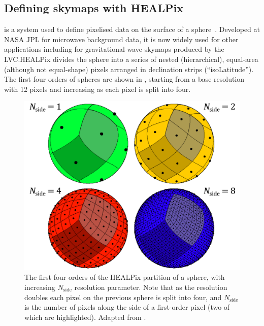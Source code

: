 
\subsection{Defining skymaps with HEALPix}
\label{sec:healpix}
\begin{colsection}

 is a system used to define pixelised data on the surface of a sphere~\citep{HEALPix}. Developed at NASA JPL for microwave background data, it is now widely used for other applications including for gravitational-wave skymaps produced by the LVC.\@ HEALPix divides the sphere into a series of nested (hierarchical), equal-area (although not equal-shape) pixels arranged in declination strips (``isoLatitude''). The first four orders of spheres are shown in , starting from a base resolution with 12 pixels and increasing as each pixel is split into four.

\begin{figure}[t]
    \begin{center}
        \includegraphics[width=0.7\linewidth]{images/healpix.pdf}
    \end{center}
    \caption[HEALPix partitions of a sphere]{
        The first four orders of the HEALPix partition of a sphere, with increasing $N_\text{side}$ resolution parameter. Note that as the resolution doubles each pixel on the previous sphere is split into four, and $N_\text{side}$ is the number of pixels along the side of a first-order pixel (two of which are highlighted). Adapted from \citet{HEALPix}.
    }\label{fig:healpix}
\end{figure}


\end{colsection}
